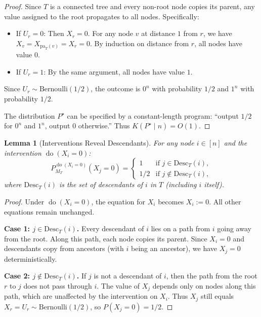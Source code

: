 \documentclass{article}
\theoremstyle{plain}
\newtheorem{lemma}[theorem]{Lemma}
\theoremstyle{definition}
\newcommand{\pa}{\mathrm{pa}}
\newcommand{\Desc}{\mathrm{Desc}}
\DeclareMathOperator{\doop}{do}
\begin{document}
\begin{proof}
Since $T$ is a connected tree and every non-root node copies its parent, any value assigned to the root propagates to all nodes. Specifically:
\begin{itemize}
    \item If $U_r = 0$: Then $X_r = 0$. For any node $v$ at distance $1$ from $r$, we have $X_v = X_{\pa_T(v)} = X_r = 0$. By induction on distance from $r$, all nodes have value $0$.
    \item If $U_r = 1$: By the same argument, all nodes have value $1$.
\end{itemize}
Since $U_r \sim \mathrm{Bernoulli}(1/2)$, the outcome is $0^n$ with probability $1/2$ and $1^n$ with probability $1/2$.

The distribution $P^\star$ can be specified by a constant-length program: ``output $1/2$ for $0^n$ and $1^n$, output $0$ otherwise.'' Thus $K(P^\star \mid n) = O(1)$.
\end{proof}

\begin{lemma}[Interventions Reveal Descendants]
\label{lem:tree-intervention}
For any node $i \in [n]$ and the intervention $\doop(X_i = 0)$:
\[
P_{M_T}^{\doop(X_i = 0)}(X_j = 0) = \begin{cases}
1 & \text{if } j \in \Desc_T(i), \\
1/2 & \text{if } j \notin \Desc_T(i),
\end{cases}
\]
where $\Desc_T(i)$ is the set of descendants of $i$ in $T$ (including $i$ itself).
\end{lemma}

\begin{proof}
Under $\doop(X_i = 0)$, the equation for $X_i$ becomes $X_i := 0$. All other equations remain unchanged.

\textbf{Case 1: $j \in \Desc_T(i)$.} Every descendant of $i$ lies on a path from $i$ going away from the root. Along this path, each node copies its parent. Since $X_i = 0$ and descendants copy from ancestors (with $i$ being an ancestor), we have $X_j = 0$ deterministically.

\textbf{Case 2: $j \notin \Desc_T(i)$.} If $j$ is not a descendant of $i$, then the path from the root $r$ to $j$ does not pass through $i$. The value of $X_j$ depends only on nodes along this path, which are unaffected by the intervention on $X_i$. Thus $X_j$ still equals $X_r = U_r \sim \mathrm{Bernoulli}(1/2)$, so $P(X_j = 0) = 1/2$.
\end{proof}
\end{document}
